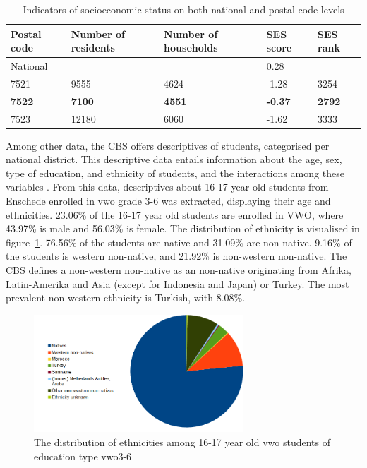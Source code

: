 \begin{table}[]
    \centering
    \begin{tabular}{|p{2cm}|p{2cm}|p{2cm}|p{2cm}|p{2cm}|}
        \hline
        Postal code & Number of residents & Number of households & SES score & SES rank \\ \hline
        National &  &  & 0.28 &  \\ \hline
        7521 & 9555 & 4624 & -1.28 & 3254 \\ \hline
        \textbf{7522} & \textbf{7100} & \textbf{4551} & \textbf{-0.37} & \textbf{2792} \\ \hline
        7523 & 12180 & 6060 & -1.62 & 3333 \\ \hline
    \end{tabular}
    \caption{Indicators of socioeconomic status on both national and postal code levels \protect\cite{scp}}
\label{tab:scpses}
\end{table}


Among other data, the CBS offers descriptives of students, categorised per national district. This descriptive data entails information about the age, sex, type of education, and ethnicity of students, and the interactions among these variables \cite{cbsethn}. From this data, descriptives about 16-17 year old students from Enschede enrolled in vwo grade 3-6 was extracted, displaying their age and ethnicities. 23.06\% of the 16-17 year old students are enrolled in VWO, where 43.97\% is male and 56.03\% is female. The distribution of ethnicity is visualised in figure~\ref{fig:ethnicitychart}. 76.56\% of the students are native and 31.09\% are non-native. 9.16\% of the students is western non-native, and 21.92\% is non-western non-native. The CBS defines a non-western non-native as an non-native originating from Afrika, Latin-Amerika and Asia (except for Indonesia and Japan) or Turkey. The most prevalent non-western ethnicity is Turkish, with 8.08\%.

\begin{figure}
    \centering
    \includegraphics[width=0.7\textwidth]{img/ethnicitychart.png}
    \caption{The distribution of ethnicities among 16-17 year old vwo students of education type vwo3-6 \protect\cite{cbsethn}}
    \label{fig:ethnicitychart}
\end{figure}

